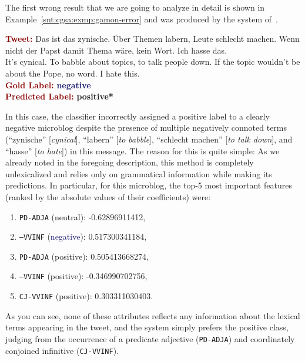 The first wrong result that we are going to analyze in detail is shown
in Example~\ref{snt:cgsa:exmp:gamon-error} and was produced by the
system of~\citet{Gamon:04}.
\begin{example}\label{snt:cgsa:exmp:mohammad-error}
  \noindent\textup{\bfseries\textcolor{darkred}{Tweet:}} {\upshape Das ist das zynische. \"Uber Themen labern, Leute schlecht machen. Wenn nicht der Papst damit Thema w\"are, kein Wort. Ich hasse das.}\\
  \noindent It's cynical.  To babble about topics, to talk people
  down.  If the topic wouldn't be about the Pope, no word. I
  hate this.\\[\exampleSep]
  \noindent\textup{\bfseries\textcolor{darkred}{Gold Label:}}\hspace*{4.3em}\textbf{%
    \upshape\textcolor{midnightblue}{negative}}\\
 \noindent\textup{\bfseries\textcolor{darkred}{Predicted Label:}}\hspace*{2em}\textbf{%
    \upshape\textcolor{green3}{positive*}}\label{snt:cgsa:exmp:gamon-error}
\end{example}
\noindent{} In this case, the classifier incorrectly assigned a
positive label to a clearly negative microblog despite the presence
of multiple negatively connoted terms (``zynische''
[\emph{cynical}], ``labern'' [\emph{to babble}], ``schlecht machen''
[\emph{to talk down}], and ``hasse'' [\emph{to hate}]) in this
message.  The reason for this is quite simple: As we already noted
in the foregoing description, this method is completely
unlexicalized and relies only on grammatical information while
making its predictions.  In particular, for this microblog, the
top-5 most important features (ranked by the absolute values of
their coefficients) were:
\begin{enumerate}
\item \texttt{PD-ADJA} (\textcolor{black}{neutral}): -0.62896911412,
\item \texttt{---VVINF} (\textcolor{midnightblue}{negative}): 0.517300341184,
\item \texttt{PD-ADJA} (\textcolor{green3}{positive}): 0.505413668274,
\item \texttt{---VVINF} (\textcolor{green3}{positive}): -0.346990702756,
\item \texttt{CJ-VVINF} (\textcolor{green3}{positive}):
  0.303311030403.
\end{enumerate}
As you can see, none of these attributes reflects any information
about the lexical terms appearing in the tweet, and the system simply
prefers the positive class, judging from the occurrence of a predicate
adjective (\texttt{PD-ADJA}) and coordinately conjoined infinitive
(\texttt{CJ-VVINF}).

